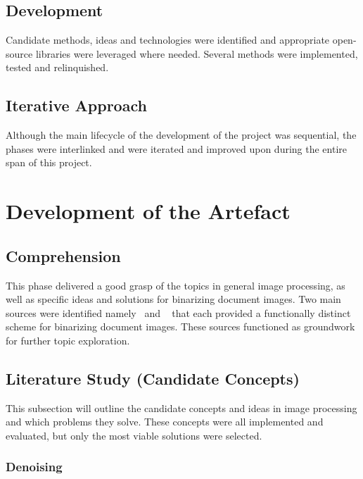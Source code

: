 \documentclass[a4paper, 12pt]{report}
\begin{document}
\subsection{Development}
Candidate methods, ideas and technologies were identified and appropriate
open-source libraries were leveraged where needed. Several methods were
implemented, tested and relinquished.

\subsection{Iterative Approach}
Although the main lifecycle of the development of the project was sequential,
the phases were interlinked and were iterated and improved upon during the
entire span of this project.

\newpage

\section{Development of the Artefact}
\subsection{Comprehension}
This phase delivered a good grasp of the topics in general image processing, as
well as specific ideas and solutions for binarizing document images. Two main
sources were identified namely~\cite{su2012robust} and
~\cite{gatos2006adaptive} that each provided a functionally distinct scheme for
binarizing document images. These sources functioned as groundwork for further
topic exploration.

\subsection{Literature Study (Candidate Concepts)}
This subsection will outline the candidate concepts and ideas in image
processing and which problems they solve. These concepts were all implemented
and evaluated, but only the most viable solutions were selected.

\subsubsection{Denoising}
\end{document}
